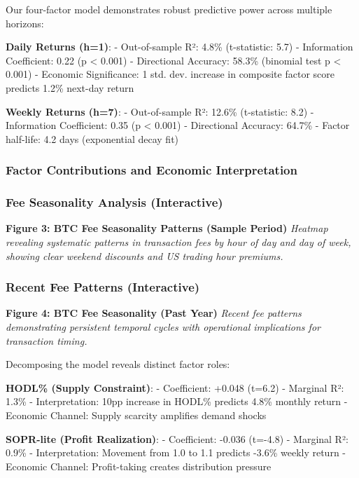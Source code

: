 \documentclass[
  12pt,
  letterpaper,
  DIV=11,
  numbers=noendperiod]{scrartcl}
\begin{document}
Our four-factor model demonstrates robust predictive power across
multiple horizons:

\textbf{Daily Returns (h=1)}: - Out-of-sample R²: 4.8\% (t-statistic:
5.7) - Information Coefficient: 0.22 (p \textless{} 0.001) - Directional
Accuracy: 58.3\% (binomial test p \textless{} 0.001) - Economic
Significance: 1 std. dev. increase in composite factor score predicts
1.2\% next-day return

\textbf{Weekly Returns (h=7)}: - Out-of-sample R²: 12.6\% (t-statistic:
8.2) - Information Coefficient: 0.35 (p \textless{} 0.001) - Directional
Accuracy: 64.7\% - Factor half-life: 4.2 days (exponential decay fit)

\subsubsection{Factor Contributions and Economic
Interpretation}\label{factor-contributions-and-economic-interpretation}

\subsubsection{Fee Seasonality Analysis
(Interactive)}\label{fee-seasonality-analysis-interactive}

\textbf{Figure 3: BTC Fee Seasonality Patterns (Sample Period)}
\emph{Heatmap revealing systematic patterns in transaction fees by hour
of day and day of week, showing clear weekend discounts and US trading
hour premiums.}

\subsubsection{Recent Fee Patterns
(Interactive)}\label{recent-fee-patterns-interactive}

\textbf{Figure 4: BTC Fee Seasonality (Past Year)} \emph{Recent fee
patterns demonstrating persistent temporal cycles with operational
implications for transaction timing.}

Decomposing the model reveals distinct factor roles:

\textbf{HODL\% (Supply Constraint)}: - Coefficient: +0.048 (t=6.2) -
Marginal R²: 1.3\% - Interpretation: 10pp increase in HODL\% predicts
4.8\% monthly return - Economic Channel: Supply scarcity amplifies
demand shocks

\textbf{SOPR-lite (Profit Realization)}: - Coefficient: -0.036 (t=-4.8)
- Marginal R²: 0.9\% - Interpretation: Movement from 1.0 to 1.1 predicts
-3.6\% weekly return - Economic Channel: Profit-taking creates
distribution pressure
\end{document}
